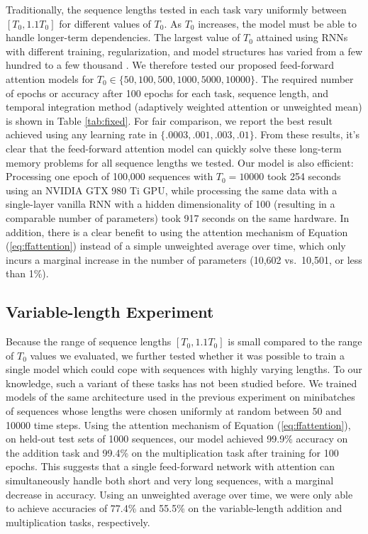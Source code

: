 \documentclass{article} %
\begin{document}
Traditionally, the sequence lengths tested in each task vary uniformly between $[T_0, 1.1T_0]$ for different values of $T_0$.
As $T_0$ increases, the model must be able to handle longer-term dependencies.
The largest value of $T_0$ attained using RNNs with different training, regularization, and model structures has varied from a few hundred \citep{martens2011learning,sutskever2013importance,le2015simple,krueger2015regularizing,arjovsky2015unitary} to a few thousand \citep{hochreiter1997long,jaegar2012long}.
We therefore tested our proposed feed-forward attention models for $T_0 \in \{50, 100, 500, 1000, 5000, 10000\}$.
The required number of epochs or accuracy after 100 epochs for each task, sequence length, and temporal integration method (adaptively weighted attention or unweighted mean) is shown in Table \ref{tab:fixed}.
For fair comparison, we report the best result achieved using any learning rate in $\{.0003, .001, .003, .01\}$.
From these results, it's clear that the feed-forward attention model can quickly solve these long-term memory problems for all sequence lengths we tested.
Our model is also efficient: Processing one epoch of 100,000 sequences with $T_0 = 10000$ took 254 seconds using an NVIDIA GTX 980 Ti GPU, while processing the same data with a single-layer vanilla RNN with a hidden dimensionality of 100 (resulting in a comparable number of parameters) took 917 seconds on the same hardware.
In addition, there is a clear benefit to using the attention mechanism of Equation (\ref{eq:ffattention}) instead of a simple unweighted average over time, which only incurs a marginal increase in the number of parameters (10,602 vs.\ 10,501, or less than 1\%).

\subsection{Variable-length Experiment}

Because the range of sequence lengths $[T_0, 1.1T_0]$ is small compared to the range of $T_0$ values we evaluated, we further tested whether it was possible to train a single model which could cope with sequences with highly varying lengths.
To our knowledge, such a variant of these tasks has not been studied before.
We trained models of the same architecture used in the previous experiment on minibatches of sequences whose lengths were chosen uniformly at random between 50 and 10000 time steps.
Using the attention mechanism of Equation (\ref{eq:ffattention}), on held-out test sets of 1000 sequences, our model achieved 99.9\% accuracy on the addition task and 99.4\% on the multiplication task after training for 100 epochs.
This suggests that a single feed-forward network with attention can simultaneously handle both short and very long sequences, with a marginal decrease in accuracy.
Using an unweighted average over time, we were only able to achieve accuracies of 77.4\% and 55.5\% on the variable-length addition and multiplication tasks, respectively.
\end{document}
